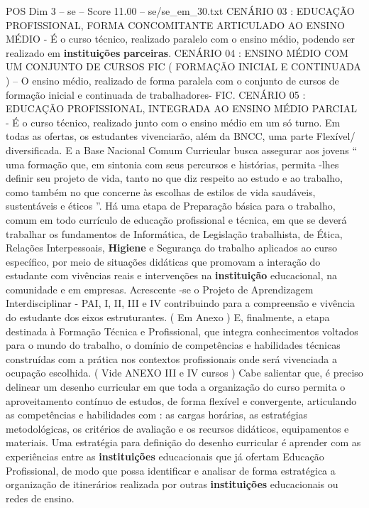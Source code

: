 \begin{textsample}{POS Dim 3 – se – Score 11.00 – se/se\_em\_30.txt}
CENÁRIO 03 : EDUCAÇÃO PROFISSIONAL, FORMA CONCOMITANTE ARTICULADO AO ENSINO MÉDIO - É o curso técnico, realizado paralelo com o ensino médio, podendo ser realizado em \textbf{instituições} \textbf{parceiras}.
CENÁRIO 04 : ENSINO MÉDIO COM UM CONJUNTO DE CURSOS FIC ( FORMAÇÃO INICIAL E CONTINUADA ) – O ensino médio, realizado de forma paralela com o conjunto de cursos de formação inicial e continuada de trabalhadores- FIC.
CENÁRIO 05 : EDUCAÇÃO PROFISSIONAL, INTEGRADA AO ENSINO MÉDIO PARCIAL - É o curso técnico, realizado junto com o ensino médio em um só turno.
Em todas as ofertas, os estudantes vivenciarão, além da BNCC, uma parte Flexível/ diversificada.
E a Base Nacional Comum Curricular busca assegurar aos jovens “ uma formação que, em sintonia com seus percursos e histórias, permita -lhes definir seu projeto de vida, tanto no que diz respeito ao estudo e ao trabalho, como também no que concerne às escolhas de estilos de vida saudáveis, sustentáveis e éticos ”.
Há uma etapa de Preparação básica para o trabalho, comum em todo currículo de educação profissional e técnica, em que se deverá trabalhar os fundamentos de Informática, de Legislação trabalhista, de Ética, Relações Interpessoais, \textbf{Higiene} e Segurança do trabalho aplicados ao curso específico, por meio de situações didáticas que promovam a interação do estudante com vivências reais e intervenções na \textbf{instituição} educacional, na comunidade e em empresas.
Acrescente -se o Projeto de Aprendizagem Interdisciplinar - PAI, I, II, III e IV contribuindo para a compreensão e vivência do estudante dos eixos estruturantes. ( Em Anexo ) E, finalmente, a etapa destinada à Formação Técnica e Profissional, que integra conhecimentos voltados para o mundo do trabalho, o domínio de competências e habilidades técnicas construídas com a prática nos contextos profissionais onde será vivenciada a ocupação escolhida. ( Vide ANEXO III e IV cursos ) Cabe salientar que, é preciso delinear um desenho curricular em que toda a organização do curso permita o aproveitamento contínuo de estudos, de forma flexível e convergente, articulando as competências e habilidades com : as cargas horárias, as estratégias metodológicas, os critérios de avaliação e os recursos didáticos, equipamentos e materiais.
Uma estratégia para definição do desenho curricular é aprender com as experiências entre as \textbf{instituições} educacionais que já ofertam Educação Profissional, de modo que possa identificar e analisar de forma estratégica a organização de itinerários realizada por outras \textbf{instituições} educacionais ou redes de ensino.

\end{textsample}
